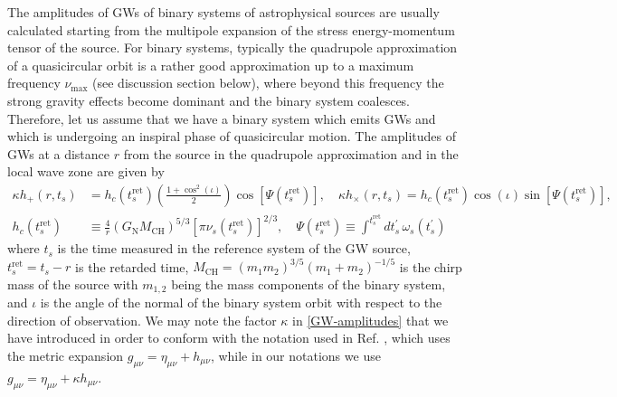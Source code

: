 \documentclass[a4paper,11pt]{article}
\begin{document}
The amplitudes of GWs of binary systems of astrophysical sources are usually calculated starting from the multipole expansion of the stress energy-momentum tensor of the source. For binary systems, typically the quadrupole approximation of a quasicircular orbit is a rather good approximation up to a maximum frequency $\nu_\text{max}$ (see discussion section below), where beyond this frequency the strong gravity effects become dominant and the binary system coalesces. Therefore, let us assume that we have a binary system which emits GWs and which is undergoing an inspiral phase of quasicircular motion.  The amplitudes of GWs at a distance $r$ from the source in the quadrupole approximation and in the local wave zone are given by \cite{Maggiore:1900zz}
\begin{align}\label{GW-amplitudes}
\kappa h_+(r, t_s) & = h_c(t_s^\text{ret}) \left(\frac{1+\cos^2(\iota)}{2}\right)\cos[\Psi(t_s^{\text{ret}})], \quad \kappa h_\times(r, t_s)=h_c(t_s^\text{ret}) \cos(\iota)\sin[\Psi(t_s^\text{ret})],\nonumber \\
h_c(t_s^\text{ret}) & \equiv \frac{4}{r} \left(G_\text{N} M_\text{CH} \right)^{5/3} \left[\pi \nu_s(t_s^\text{ret})\right]^{2/3}, \quad \Psi(t_s^\text{ret})\equiv \int^{t_s^\text{ret}} dt_s^{\prime}\,\omega_s(t_s^{\prime})
\end{align}
where $t_s$ is the time measured in the reference system of the GW source, $t_s^\text{ret}=t_s-r$ is the retarded time, $M_\text{CH}=(m_1m_2)^{3/5}(m_1+m_2)^{-1/5}$ is the chirp mass of the source with $m_{1,2}$ being the mass components of the binary system, and $\iota$ is the angle of the normal of the binary system orbit with respect to the direction of observation. %
We may note the factor $\kappa$ in \eqref{GW-amplitudes} that we have introduced in order to conform with the notation used in Ref. \cite{Maggiore:1900zz}, which uses the metric expansion $g_{\mu\nu}=\eta_{\mu\nu}+ h_{\mu\nu}$, while in our notations we use $g_{\mu\nu}=\eta_{\mu\nu}+ \kappa h_{\mu\nu}$. 
\end{document}
